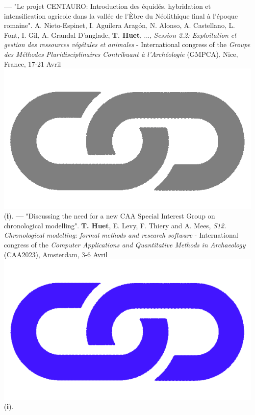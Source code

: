 \documentclass{article}
\begin{document}
\smallbreak
\textbf{--- }"Le projet CENTAURO: Introduction des équidés, hybridation et intensification agricole dans la vallée de l'Èbre du Néolithique final à l'époque romaine". A. Nieto-Espinet, I. Aguilera Aragón, N. Alonso, A. Castellano, L. Font, I. Gil, A. Grandal D'anglade, \textbf{T. Huet}, ..., \textit{Session 2.2: Exploitation et gestion des ressources végétales et animales} - International congress of the \textit{Groupe des Méthodes Pluridisciplinaires Contribuant à l'Archéologie} (GMPCA), Nice, France, 17-21 Avril \href{https://gmpca2023.sciencesconf.org/}{\includegraphics[scale=0.02]{link_grey.png}} (\textbf{i}).
\smallbreak
\textbf{--- }"Discussing the need for a new CAA Special Interest Group on chronological modelling". \textbf{T. Huet}, E. Levy, F. Thiery and A. Mees, \textit{S12. Chronological modelling: formal methods and research software} - International congress of the \textit{Computer Applications and Quantitative Methods in Archaeology} (CAA2023), Amsterdam, 3-6 Avril \href{https://historical-time.github.io/caa23/sig/pres}{\includegraphics[scale=0.015]{link_darkblue.png}} (\textbf{i}).
\smallbreak
\end{document}
